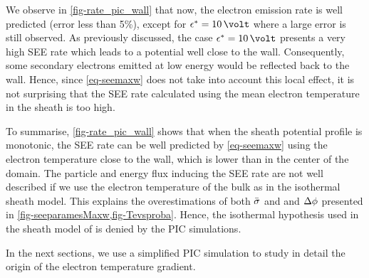    We observe in \cref{fig-rate_pic_wall} that now, the electron emission rate is well predicted (error less than 5\%), except for $\crover=10\,\volt$ where a large error is still observed.
   As previously discussed, the case $\crover=10\,\volt$ presents a very high SEE rate which leads to a potential well close to the wall.
   Consequently, some secondary electrons emitted at low energy would be reflected back to the wall.
   Hence, since \cref{eq-seemaxw} does not take into account this local effect, it is not surprising that the SEE rate calculated using the mean electron temperature in the sheath is too high.
   
   To summarise, \cref{fig-rate_pic_wall} shows that when the sheath potential profile is monotonic, the \ac{SEE} rate can be well predicted by \cref{eq-seemaxw} using the electron temperature close to the wall, which is lower than in the center of the domain.
   The particle and energy flux inducing the \ac{SEE} rate are not well described if we use the electron temperature of the bulk as in the isothermal sheath model.
   This explains the overestimations of both $ \bar{\sigma }$ and and $\Delta \phi$ presented in \cref{fig-seeparamesMaxw,fig-Tevsproba}.
   Hence, the isothermal hypothesis used in the sheath model of  is denied by the PIC simulations.
   
   In the next sections, we use a simplified \ac{PIC} simulation to study in detail the origin of the electron temperature gradient.
   

